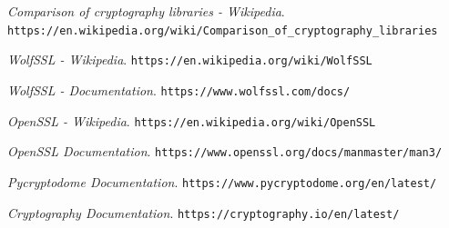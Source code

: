 \documentclass[11pt]{article}
\begin{document}
\vfill
\begin{thebibliography}{99}

{\em Comparison of cryptography libraries - Wikipedia}. \newline
 \verb|https://en.wikipedia.org/wiki/Comparison_of_cryptography_libraries|

{\em WolfSSL - Wikipedia}. \newline
 \verb|https://en.wikipedia.org/wiki/WolfSSL|

{\em WolfSSL - Documentation}. \newline
 \verb|https://www.wolfssl.com/docs/|

{\em OpenSSL - Wikipedia}. \newline
 \verb|https://en.wikipedia.org/wiki/OpenSSL|

{\em OpenSSL Documentation}. \newline
\verb|https://www.openssl.org/docs/manmaster/man3/|

{\em Pycryptodome Documentation}. \newline
\verb|https://www.pycryptodome.org/en/latest/|

{\em Cryptography Documentation}. \newline
\verb|https://cryptography.io/en/latest/|

\end{thebibliography}
\end{document}
